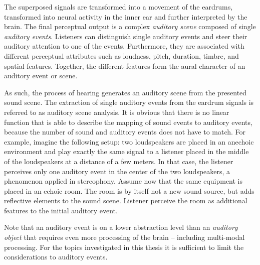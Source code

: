 The superposed signals are transformed into a movement of the
eardrums, transformed into neural activity in the inner ear and further interpreted by
the brain. The final perceptual output is a complex \emph{auditory scene}
composed of single \emph{auditory events}. Listeners can distinguish 
single auditory events and steer their auditory attention to one of the events.
Furthermore, they are associated with different perceptual attributes such as
loudness, pitch, duration, timbre, and spatial features.\autocite{Letowski1989}
Together, the different features form the aural character of an auditory event
or scene.

As such, the process of hearing generates an auditory scene
from the presented sound scene. The extraction of
single auditory events from the eardrum signals is referred to as
auditory scene analysis. It is obvious that there is no linear function
that is able to describe the mapping of sound events to auditory events, because
the number of sound and auditory events does not have to match.
For example, imagine the following setup: two loudspeakers are placed in an
anechoic environment and play exactly the same signal to a listener placed
in the middle of the loudspeakers at a distance of a few meters.
In that case, the listener perceives only one auditory event in the center of the two
loudspeakers, a phenomenon applied in stereophony. Assume now that the same equipment
is placed in an echoic room. The room is by itself not a new sound source, but
adds reflective elements to the sound scene. Listener perceive the room as additional
features to the initial auditory event.

Note that an auditory event is on a lower abstraction level
than an \emph{auditory object}
that requires even more processing of the brain -- including multi-modal
processing.\autocite[A discussion of auditory objects is presented in][]{Kubovy2001}
For the topics investigated in this thesis it is
sufficient to limit the considerations to auditory events.

